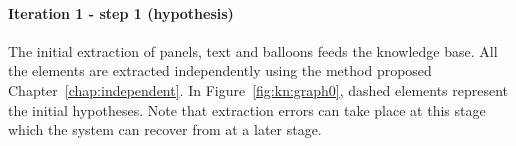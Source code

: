 
\paragraph{Iteration 1 - step 1 (hypothesis)} %
\label{par:step_1}
The initial extraction of panels, text and balloons feeds the knowledge base.
All the elements are extracted independently using the method proposed Chapter~\ref{chap:independent}.
In Figure~\ref{fig:kn:graph0}, dashed elements represent the initial hypotheses.
Note that extraction errors can take place at this stage which the system can recover from at a later stage.


